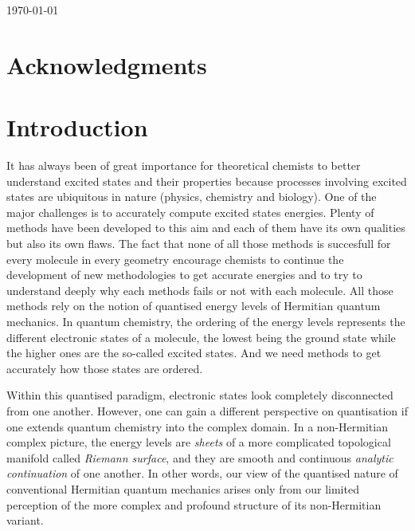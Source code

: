 \documentclass[11pt,a4paper]{article}
\begin{document}
\vfill
\hfill \today

\newpage

\section*{Acknowledgments}

\tableofcontents

\newpage

\section{Introduction}

It has always been of great importance for theoretical chemists to better understand excited states and their properties because processes involving excited states are ubiquitous in nature (physics, chemistry and biology). One of the major challenges is to accurately compute excited states energies. Plenty of methods have been developed to this aim and each of them have its own qualities but also its own flaws. The fact that none of all those methods is succesfull for every molecule in every geometry encourage chemists to continue the development of new methodologies to get accurate energies and to try to understand deeply why each methods fails or not with each molecule. All those methods rely on the notion of quantised energy levels of Hermitian quantum mechanics. In quantum chemistry, the ordering of the energy levels represents the different electronic states of a molecule, the lowest being the ground state while the higher ones are the so-called excited states. And we need methods to get accurately how those states are ordered.

Within this quantised paradigm, electronic states look completely disconnected from one another.
However, one can gain a different perspective on quantisation if one extends quantum chemistry into the complex domain.
In a non-Hermitian complex picture, the energy levels are \textit{sheets} of a more complicated topological manifold called \textit{Riemann surface}, and they are smooth and continuous \textit{analytic continuation} of one another.
In other words, our view of the quantised nature of conventional Hermitian quantum mechanics arises only from our limited perception of the more complex and profound structure of its non-Hermitian variant.
\end{document}
